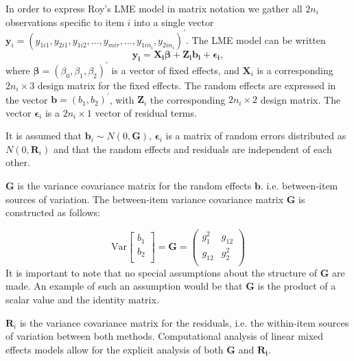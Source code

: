 \documentclass[12pt, a4paper]{report}
\theoremstyle{plain}
\theoremstyle{definition}
\theoremstyle{remark}
\begin{document}
	In order to express Roy's LME model in matrix notation we gather all $2n_i$ observations specific to item $i$ into a single vector  $\boldsymbol{y}_{i} = (y_{1i1},y_{2i1},y_{1i2},\ldots,y_{mir},\ldots,y_{1in_{i}},y_{2in_{i}})^\prime.$ The LME model can be written
	\[
	\boldsymbol{y_{i}} = \boldsymbol{X_{i}\beta} + \boldsymbol{Z_{i}b_{i}} + \boldsymbol{\epsilon_{i}},
	\]
	where $\boldsymbol{\beta}=(\beta_0,\beta_1,\beta_2)^\prime$ is a vector of fixed effects, and $\boldsymbol{X}_i$ is a corresponding $2n_i\times 3$ design matrix for the fixed effects. The random effects are expressed in the vector $\boldsymbol{b}=(b_1,b_2)^\prime$, with $\boldsymbol{Z}_i$ the corresponding $2n_i\times 2$ design matrix. The vector $\boldsymbol{\epsilon}_i$ is a $2n_i\times 1$ vector of residual terms.
	
	It is assumed that $\boldsymbol{b}_i \sim N(0,\boldsymbol{G})$, $\boldsymbol{\epsilon}_i$ is a matrix of random errors distributed as $N(0,\boldsymbol{R}_i)$ and that the random effects and residuals are independent of each other.
	
	
	$\boldsymbol{G}$ is the variance covariance matrix for the random effects $\boldsymbol{b}$.
	i.e. between-item sources of variation. The between-item variance covariance matrix $\boldsymbol{G}$ is constructed as follows:
	
	\[ \mbox{Var}  \left[
	\begin{array}{c}
	b_1   \\
	b_2  \\
	\end{array}
	\right] =  \boldsymbol{G} =\left(
	\begin{array}{cc}
	g^2_1  & g_{12} \\
	g_{12} & g^2_2 \\
	\end{array}
	\right) \]
	It is important to note that no special assumptions about the structure of $\boldsymbol{G}$ are made. An example of such an assumption would be that $\boldsymbol{G}$ is the product of a scalar value and the identity matrix.
	
	$\boldsymbol{R}_{i}$ is the variance covariance matrix for the residuals, i.e. the within-item sources of variation between both methods. Computational analysis of linear mixed effects models allow for the explicit analysis of both $\boldsymbol{G}$ and $\boldsymbol{R_i}$.
	
\end{document}
